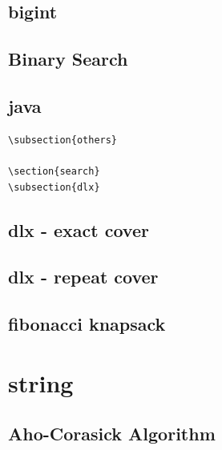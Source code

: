 \documentclass[a4paper,5pt,titlepage]{article}
\begin{document}
\subsection{bigint}

\subsection{Binary Search}

\subsection{java}


\begin{verbatim}
\subsection{others}

\section{search}
\subsection{dlx}

\end{verbatim}

\subsection{dlx - exact cover}

\subsection{dlx - repeat cover}

\subsection{fibonacci knapsack}

\section{string}
\subsection{Aho-Corasick Algorithm}

\end{document}
